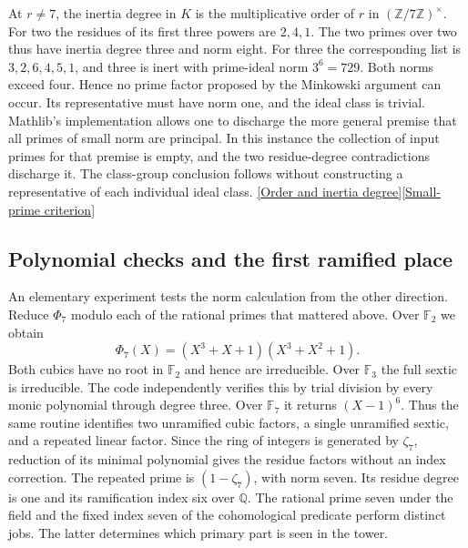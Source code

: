 \documentclass[12pt,letterpaper]{article}
\begin{document}
At \(r\ne7\), the inertia degree in \(K\) is the multiplicative order of \(r\) in \((\mathbb Z/7\mathbb Z)^\times\). For two the residues of its first three powers are \(2,4,1\). The two primes over two thus have inertia degree three and norm eight. For three the corresponding list is \(3,2,6,4,5,1\), and three is inert with prime-ideal norm \(3^6=729\). Both norms exceed four. Hence no prime factor proposed by the Minkowski argument can occur. Its representative must have norm one, and the ideal class is trivial. Mathlib's implementation allows one to discharge the more general premise that all primes of small norm are principal. In this instance the collection of input primes for that premise is empty, and the two residue-degree contradictions discharge it. The class-group conclusion follows without constructing a representative of each individual ideal class. \href{https://github.com/leanprover-community/mathlib4/blob/0df444a360eaa60ab8c11dca51a86af692955474/Mathlib/NumberTheory/NumberField/Cyclotomic/Ideal.lean#L289-L306}{[Order and inertia degree]}\quad\href{https://github.com/leanprover-community/mathlib4/blob/0df444a360eaa60ab8c11dca51a86af692955474/Mathlib/NumberTheory/NumberField/ClassNumber.lean#L144-L170}{[Small-prime criterion]}

\subsection{Polynomial checks and the first ramified place}

An elementary experiment tests the norm calculation from the other direction. Reduce \(\Phi_7\) modulo each of the rational primes that mattered above. Over \(\mathbb F_2\) we obtain
\[
 \Phi_7(X)=(X^3+X+1)(X^3+X^2+1).
\]
Both cubics have no root in \(\mathbb F_2\) and hence are irreducible. Over \(\mathbb F_3\) the full sextic is irreducible. The code independently verifies this by trial division by every monic polynomial through degree three. Over \(\mathbb F_7\) it returns \((X-1)^6\). Thus the same routine identifies two unramified cubic factors, a single unramified sextic, and a repeated linear factor. Since the ring of integers is generated by \(\zeta_7\), reduction of its minimal polynomial gives the residue factors without an index correction. The repeated prime is \((1-\zeta_7)\), with norm seven. Its residue degree is one and its ramification index six over \(\mathbb Q\). The rational prime seven under the field and the fixed index seven of the cohomological predicate perform distinct jobs. The latter determines which primary part is seen in the tower.
\end{document}
